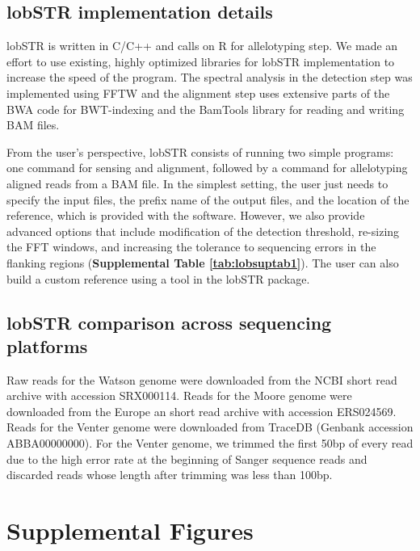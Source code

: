 \subsection{lobSTR implementation details}
lobSTR is written in C/C++ and calls on R for allelotyping step. We made an effort to use existing, highly optimized libraries for lobSTR implementation to increase the speed of the program. The spectral analysis in the detection step was implemented using FFTW \cite{FrigoJohnson1998} and the alignment step uses extensive parts of the BWA code \cite{LiDurbin2009a} for BWT-indexing and the BamTools library \cite{BarnettGarrisonQuinlanEtAl2011} for reading and writing BAM files. 

From the user's perspective, lobSTR consists of running two simple programs: one command for sensing and alignment, followed by a command for allelotyping aligned reads from a BAM file. In the simplest setting, the user just needs to specify the input files, the prefix name of the output files, and the location of the reference, which is provided with the software. However, we also provide advanced options that include modification of the detection threshold, re-sizing the FFT windows, and increasing the tolerance to sequencing errors in the flanking regions (\textbf{Supplemental Table \ref{tab:lobsuptab1}}). The user can also build a custom reference using a tool in the lobSTR package.

\subsection{lobSTR comparison across sequencing platforms}
Raw reads for the Watson genome were downloaded from the NCBI short read archive with accession SRX000114. Reads for the Moore genome were downloaded from the Europe	an short read archive with accession ERS024569. Reads for the Venter genome were downloaded from TraceDB (Genbank accession ABBA00000000). For the Venter genome, we trimmed the first 50bp of every read due to the high error rate at the beginning of Sanger sequence reads and discarded reads whose length after trimming was less than 100bp.

\pagebreak
\section{Supplemental Figures}

